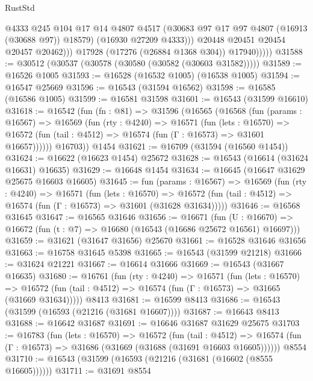 \begin{lexlean}{RustStd}
\begin{coremodule}
                        @4333
                        @245
                        @104
                        @17
                        @14
                        @4807
                        @4517
                        (@30683 @97 @17 @97 @4807 (@16913 (@30688 @97)) @18579)
                        (@16930 @27209 @4333)))
                    @20448
                    @20451
                    @20454
                    @20457
                    @20462)))
              @17928
              (@17276 (@26884 @1368 @304))
              @17940)))))
@31588 := @30512 (@30537 (@30578 (@30580 (@30582 (@30603 @31582)))))
@31589 := @16526 @1005
@31593 := @16528 (@16532 @1005) (@16538 @1005)
@31594 := @16547 @25669
@31596 := @16543 (@31594 @16562)
@31598 := @16585 (@16586 @1005)
@31599 := @16581 @31598
@31601 := @16543 (@31599 @16610)
@31618 := @16542
    (fun (fn : @81) =>
    @31596
      (@16565
        (@16568
          (fun (params : @16567) =>
          @16569
            (fun (rty : @4240) =>
            @16571
              (fun (lets : @16570) =>
              @16572 (fun (tail : @4512) => @16574 (fun (Γ : @16573) => @31601 @16657))))))
        @16703))
    @1454
@31621 := @16709 (@31594 (@16560 @1454))
@31624 := @16622 (@16623 @1454) @25672
@31628 := @16543 (@16614 (@31624 @16631) @16635)
@31629 := @16648 @1454
@31634 := @16645 (@16647 @31629 @25675 @16603 @16605)
@31645 := fun (params : @16567) =>
  @16569
    (fun (rty : @4240) =>
    @16571
      (fun (lets : @16570) =>
      @16572 (fun (tail : @4512) => @16574 (fun (Γ : @16573) => @31601 (@31628 @31634)))))
@31646 := @16568 @31645
@31647 := @16565 @31646
@31656 := @16671
    (fun (U : @16670) => @16672 (fun (t : @7) => @16680 (@16543 (@16686 @25672 @16561) @16697)))
@31659 := @31621 (@31647 @31656) @25670
@31661 := @16528 @31646 @31656
@31663 := @16758 @31645 @5398
@31665 := @16543 (@31599 @21218)
@31666 := @31624 @21221
@31667 := @16614 @31666
@31669 := @16543 (@31667 @16635)
@31680 := @16761
    (fun (rty : @4240) =>
    @16571
      (fun (lets : @16570) =>
      @16572 (fun (tail : @4512) => @16574 (fun (Γ : @16573) => @31665 (@31669 @31634)))))
    @8413
@31681 := @16599 @8413
@31686 := @16543 (@31599 (@16593 (@21216 (@31681 @16607))))
@31687 := @16643 @8413
@31688 := @16642 @31687
@31691 := @16646 @31687 @31629 @25675
@31703 := @16783
    (fun (lets : @16570) =>
    @16572
      (fun (tail : @4512) =>
      @16574 (fun (Γ : @16573) => @31686 (@31669 (@31688 (@31691 @16603 @16605))))))
    @8554
@31710 := @16543 (@31599 (@16593 (@21216 (@31681 (@16602 (@8555 @16605))))))
@31711 := @31691 @8554

\end{coremodule}
\end{lexlean}

